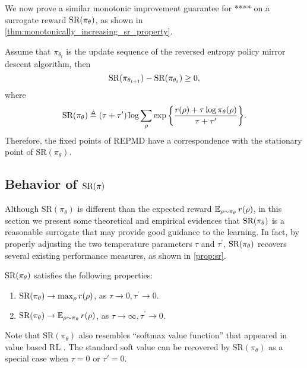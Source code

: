 We now prove a similar monotonic improvement guarantee for **** on a surrogate reward $\text{SR}(\pi_\theta) $, as shown in \cref{thm:monotonically_increasing_sr_property}.
\begin{thm}
\label{thm:monotonically_increasing_sr_property}
Assume that $\pi_{\theta_{t}}$ is the update sequence of the reversed entropy policy mirror descent algorithm, then
\begin{equation*}
	\text{SR}(\pi_{\theta_{t+1}}) - \text{SR}(\pi_{\theta_t})\ge 0,
\end{equation*}
where
\begin{equation}
\label{eq:SR}
\text{SR}(\pi_\theta) \triangleq (\tau + \tau^{\prime})\log{ \sum_{\rho}{ \exp\left\{ \frac{r(\rho) + \tau \log{\pi_\theta(\rho)} }{\tau + \tau^{\prime}} \right\} }}.
\end{equation}
Therefore, 
the fixed points of REPMD have a correspondence with the stationary point of $\text{SR}(\pi_\theta)$. 

\end{thm}

\subsection{Behavior of $\text{SR}(\pi)$}
\label{subsec:sr}
Although $\text{SR}(\pi_\theta)$ is different than the expected reward $\operatorname*{\mathbb{E}}_{\rho \sim \pi_\theta}{r(\rho)}$,  in this section we present some theoretical and empirical evidences that $\text{SR}(\pi_\theta)$ is a reasonable surrogate that may provide good guidance to the learning. 
In fact, by properly adjusting the two temperature parameters $\tau$ and $\tau^{\prime}$, $\text{SR}(\pi_\theta)$ recovers several existing performance measures, as shown in \cref{prop:sr}.
\begin{prop}
\label{prop:sr}
$\text{SR}(\pi_\theta)$ satisfies the following properties:
\begin{enumerate}[label=(\roman*)]
	\item  $\text{SR}(\pi_\theta) \to \max_{\rho}{r(\rho)}$, as $\tau \to 0, \tau^{\prime} \to 0$.
	\item $\text{SR}(\pi_\theta) \to \operatorname*{\mathbb{E}}_{\rho \sim \pi_\theta}{r(\rho)}$, as $\tau \to \infty, \tau^{\prime} \to 0$. 
\end{enumerate}	
\end{prop}
\begin{remk}
	Note that $\text{SR}(\pi_\theta)$ also resembles ``softmax value function'' that appeared in value based RL \citep{nachum2017bridging,haarnoja2018soft,ding2017cold}. The standard soft value can be recovered by $\text{SR}(\pi_\theta)$ as a special case when $\tau = 0$ or $\tau'=0$. 
\end{remk}

